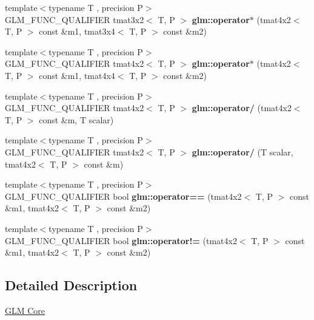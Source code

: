 \begin{DoxyCompactItemize}
\item 
\mbox{\label{type__mat4x2_8inl_a10dbd564c2e09836e8e6b92b755071c4}} 
{\footnotesize template$<$typename T , precision P$>$ }\\G\+L\+M\+\_\+\+F\+U\+N\+C\+\_\+\+Q\+U\+A\+L\+I\+F\+I\+ER tmat3x2$<$ T, P $>$ {\bfseries glm\+::operator$\ast$} (tmat4x2$<$ T, P $>$ const \&m1, tmat3x4$<$ T, P $>$ const \&m2)
\item 
\mbox{\label{type__mat4x2_8inl_ab6da5bbb14cd56a6a210175c7e75c8a4}} 
{\footnotesize template$<$typename T , precision P$>$ }\\G\+L\+M\+\_\+\+F\+U\+N\+C\+\_\+\+Q\+U\+A\+L\+I\+F\+I\+ER tmat4x2$<$ T, P $>$ {\bfseries glm\+::operator$\ast$} (tmat4x2$<$ T, P $>$ const \&m1, tmat4x4$<$ T, P $>$ const \&m2)
\item 
\mbox{\label{type__mat4x2_8inl_a0b113142b6dc2d32a34cbe0fe27da3d0}} 
{\footnotesize template$<$typename T , precision P$>$ }\\G\+L\+M\+\_\+\+F\+U\+N\+C\+\_\+\+Q\+U\+A\+L\+I\+F\+I\+ER tmat4x2$<$ T, P $>$ {\bfseries glm\+::operator/} (tmat4x2$<$ T, P $>$ const \&m, T scalar)
\item 
\mbox{\label{type__mat4x2_8inl_a5354c891de3062e954e26233220d0875}} 
{\footnotesize template$<$typename T , precision P$>$ }\\G\+L\+M\+\_\+\+F\+U\+N\+C\+\_\+\+Q\+U\+A\+L\+I\+F\+I\+ER tmat4x2$<$ T, P $>$ {\bfseries glm\+::operator/} (T scalar, tmat4x2$<$ T, P $>$ const \&m)
\item 
\mbox{\label{type__mat4x2_8inl_ada1f939e41cfb8698776f1e46e937888}} 
{\footnotesize template$<$typename T , precision P$>$ }\\G\+L\+M\+\_\+\+F\+U\+N\+C\+\_\+\+Q\+U\+A\+L\+I\+F\+I\+ER bool {\bfseries glm\+::operator==} (tmat4x2$<$ T, P $>$ const \&m1, tmat4x2$<$ T, P $>$ const \&m2)
\item 
\mbox{\label{type__mat4x2_8inl_a5aa2e8081235bbd78c8d858494c582b8}} 
{\footnotesize template$<$typename T , precision P$>$ }\\G\+L\+M\+\_\+\+F\+U\+N\+C\+\_\+\+Q\+U\+A\+L\+I\+F\+I\+ER bool {\bfseries glm\+::operator!=} (tmat4x2$<$ T, P $>$ const \&m1, tmat4x2$<$ T, P $>$ const \&m2)
\end{DoxyCompactItemize}


\subsection{Detailed Description}
\hyperlink{group__core}{G\+LM Core} 